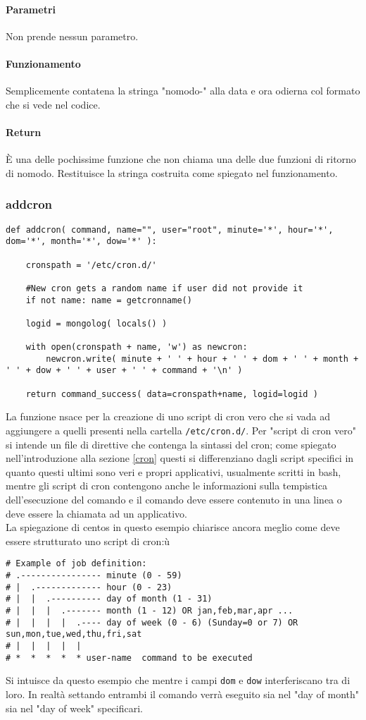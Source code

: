 \documentclass[11pt]{article}
\begin{document}
\paragraph{Parametri}
Non prende nessun parametro.
\paragraph{Funzionamento}
Semplicemente contatena la stringa "nomodo-" alla data e ora odierna col formato che si vede nel codice.
\paragraph{Return}
È una delle pochissime funzione che non chiama una delle due funzioni di ritorno di nomodo.
Restituisce la stringa costruita come spiegato nel funzionamento.

\subsubsection{addcron}\label{addcron}
\begin{lstlisting}
def addcron( command, name="", user="root", minute='*', hour='*', dom='*', month='*', dow='*' ):

    cronspath = '/etc/cron.d/' 

    #New cron gets a random name if user did not provide it
    if not name: name = getcronname()

    logid = mongolog( locals() )

    with open(cronspath + name, 'w') as newcron:
        newcron.write( minute + ' ' + hour + ' ' + dom + ' ' + month + ' ' + dow + ' ' + user + ' ' + command + '\n' )

    return command_success( data=cronspath+name, logid=logid )
\end{lstlisting}
La funzione nsace per la creazione di uno script di cron vero che si vada ad aggiungere a quelli presenti nella cartella
\texttt{/etc/cron.d/}. Per "script di cron vero" si intende un file di direttive che contenga la sintassi del cron; come spiegato
nell'introduzione alla sezione \ref{cron} questi si differenziano dagli script specifici in quanto questi ultimi sono
veri e propri applicativi, usualmente scritti in bash, mentre gli script di cron contengono anche le informazioni
sulla tempistica dell'esecuzione del comando e il comando deve essere contenuto in una linea o deve essere la chiamata
ad un applicativo.\\
La spiegazione di centos in questo esempio chiarisce ancora meglio come deve essere strutturato uno script di cron:ù
\begin{lstlisting}
# Example of job definition:
# .---------------- minute (0 - 59)
# |  .------------- hour (0 - 23)
# |  |  .---------- day of month (1 - 31)
# |  |  |  .------- month (1 - 12) OR jan,feb,mar,apr ...
# |  |  |  |  .---- day of week (0 - 6) (Sunday=0 or 7) OR sun,mon,tue,wed,thu,fri,sat
# |  |  |  |  |
# *  *  *  *  * user-name  command to be executed
\end{lstlisting}
Si intuisce da questo esempio che mentre i campi \texttt{dom} e \texttt{dow} interferiscano tra di loro. In realtà
settando entrambi il comando verrà eseguito sia nel "day of month" sia nel "day of week" specificari.
\end{document}
